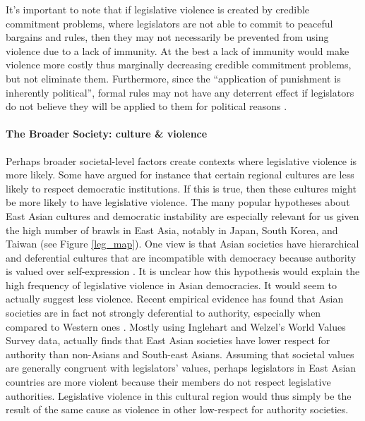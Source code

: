 \documentclass[a4paper]{article}\usepackage[]{graphicx}\usepackage[]{color}
\begin{document}
It's important to note that if legislative violence is created by credible commitment problems, where legislators are not able to commit to peaceful bargains and rules, then they may not necessarily be prevented from using violence due to a lack of immunity. At the best a lack of immunity would make violence more costly thus marginally decreasing credible commitment problems, but not eliminate them. Furthermore, since the ``application of punishment is inherently political'', formal rules may not have any deterrent effect if legislators do not believe they will be applied to them for political reasons \cite[58]{Wolfe2004}.

\paragraph{The Broader Society: culture \& violence}

Perhaps broader societal-level factors create contexts where legislative violence is more likely. Some have argued for instance that certain regional cultures are less likely to respect democratic institutions. If this is true, then these cultures might be more likely to have legislative violence. The many popular hypotheses about East Asian cultures and democratic instability are especially relevant for us given the high number of brawls in East Asia, notably in Japan, South Korea, and Taiwan (see Figure \ref{leg_map}). One view is that Asian societies have hierarchical and deferential cultures that are incompatible with democracy because authority is valued over self-expression \citep[see][212-213 for a discussion]{Dalton2005}. It is unclear how this hypothesis would explain the high frequency of legislative violence in Asian democracies. It would seem to actually suggest less violence. Recent empirical evidence has found that Asian societies are in fact not strongly deferential to authority, especially when compared to Western ones \citep{Dalton2005, KimAsianValues2010}. Mostly using Inglehart and Welzel's World Values Survey data, \cite{KimAsianValues2010} actually finds that East Asian societies have lower respect for authority than non-Asians and South-east Asians. Assuming that societal values are generally congruent with legislators' values, perhaps legislators in East Asian countries are more violent because their members do not respect legislative authorities. Legislative violence in this cultural region would thus simply be the result of the same cause as violence in other low-respect for authority societies.
\end{document}
